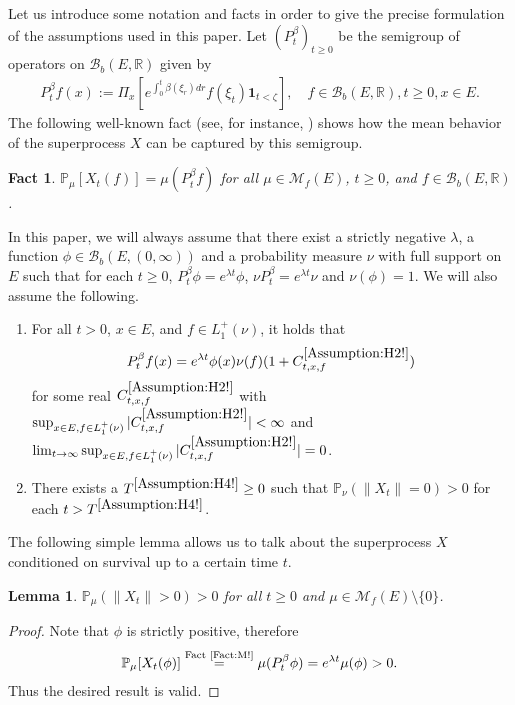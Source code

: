 \documentclass[12pt,a4paper]{amsart}
\numberwithin{equation}{section}
\theoremstyle{plain}
\newtheorem{lem}[thm]{Lemma}
\newtheorem{fact}[thm]{Fact}
\theoremstyle{definition}
\theoremstyle{remark}
\newcounter{N}
\newcounter{n}[N]
\begin{document}
Let us introduce some notation and facts in order to give the precise formulation of the assumptions used in this paper.
Let $(P_t^\beta)_{t\geq 0}$ be the semigroup of operators on $\mathcal B_b(E,\mathbb R)$ given by
\begin{align}
P_t^\beta f(x)
:= \Pi_x[e^{\int_0^t \beta(\xi_r)dr }f(\xi_t) \mathbf 1_{t < \zeta}],
\quad f\in \mathcal B_b(E,\mathbb R), t\geq 0, x\in E.
\end{align}
The following well-known fact (see, for instance, \cite[Proposition 2.27]{Li2011MeasureValued}) shows how the mean behavior of the superprocess $X$ can be captured by this semigroup.
\begin{fact} \label{Fact:M!}
$
\mathbb P_\mu[X_t(f)]
= \mu (P_t^\beta f)
$ for all $\mu \in \mathcal M_f(E)$, $t\geq 0$, and $f \in \mathcal B_b(E,\mathbb R)$.
\end{fact}
In this paper, we will always assume that there exist a strictly negative $\lambda$, a function $\phi \in \mathcal B_b(E,(0,\infty))$ and a probability measure $\nu$ with full support on $E$ such that for each $t\geq 0$, $P_t^\beta \phi = e^{\lambda t}\phi$, $\nu P_t^\beta = e^{\lambda t} \nu$ and $\nu(\phi) = 1$.
We will also assume the following.
\begin{enumerate}[label =(H\arabic*)]
\item \label{Assumption:H2!}
	For all $t>0$, $x\in E$, and $f\in L_1^+(\nu)$, it holds that \[P_t^\beta f(x) = e^{\lambda t} \phi(x) \nu(f) (1+ C^{\ref{Assumption:H2!}}_{t,x,f})\] for some real $C^{\ref{Assumption:H2!}}_{t,x,f}$ with $ \sup_{x\in E, f\in L_1^+(\nu)} |C^{\ref{Assumption:H2!}}_{t,x,f}| < \infty $ and $\lim_{t\to \infty} \sup_{x\in E, f\in L_1^+(\nu)} |C^{\ref{Assumption:H2!}}_{t,x,f}| = 0$.
\item \label{Assumption:H4!}
	There exists a $T^{\ref{Assumption:H4!}}\geq 0$ such that $\mathbb P_\nu(\|X_t\| = 0)>0$ for each $t> T^{\ref{Assumption:H4!}}$.
\end{enumerate}

	The following simple lemma allows us to talk about the superprocess $X$ conditioned on survival up to a certain time $t$.
\begin{lem} \label{Lemma:Nd!}
	$\mathbb P_\mu(\|X_t\| > 0) > 0$ for all $t\geq 0$ and $\mu \in \mathcal M_f(E)\setminus \{0\}$.
\end{lem}
\begin{proof}
	Note that $\phi$ is strictly positive, therefore
\begin{align}
	\mathbb P_\mu[X_t(\phi)]
	\overset{\text{Fact \ref{Fact:M!}}}= \mu(P_t^\beta \phi)
	=e^{\lambda t}\mu(\phi)>0.
\end{align}
	Thus the desired result is valid.
\end{proof}
\end{document}

